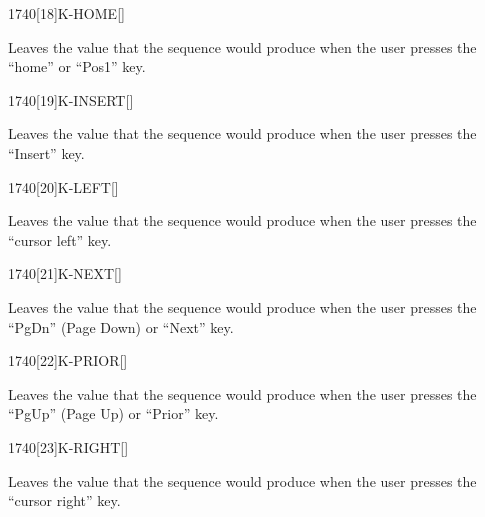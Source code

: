 \begin{worddef}{1740}[18]{K-HOME}[]%
\item {}

	Leaves the value  that the sequence 
	 would produce when the user presses the
	``home'' or ``Pos1'' key.

\end{worddef}


\begin{worddef}{1740}[19]{K-INSERT}[]%
\item {}

	Leaves the value  that the sequence 
	 would produce when the user presses the
	``Insert'' key.

\end{worddef}


\begin{worddef}{1740}[20]{K-LEFT}[]%
\item {}

	Leaves the value  that the sequence 
	 would produce when the user presses the
	``cursor left'' key.

\end{worddef}


\begin{worddef}{1740}[21]{K-NEXT}[]%
\item {}

	Leaves the value  that the sequence 
	 would produce when the user presses the
	``PgDn'' (Page Down) or ``Next'' key.

\end{worddef}


\begin{worddef}{1740}[22]{K-PRIOR}[]%
\item {}

	Leaves the value  that the sequence 
	 would produce when the user presses the
	``PgUp'' (Page Up) or ``Prior'' key.

\end{worddef}


\begin{worddef}{1740}[23]{K-RIGHT}[]%
\item {}

	Leaves the value  that the sequence 
	 would produce when the user presses the
	``cursor right'' key.

\end{worddef}


